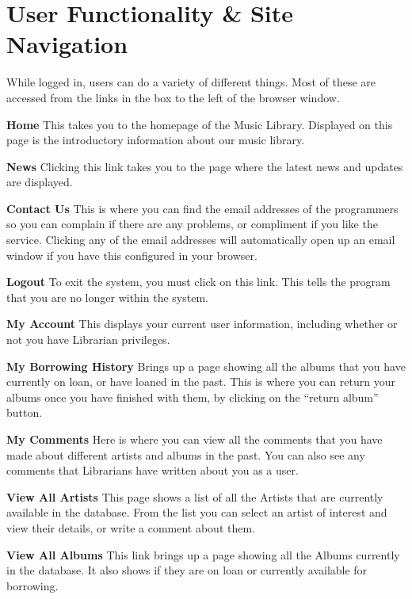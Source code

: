 \documentclass{article}
\begin{document}
\section{User Functionality \& Site Navigation}
While logged in, users can do a variety of different things. Most of these are accessed from the links in the box to the left of the browser window.
\begin{description}
\item{\bf{Home}}
This takes you to the homepage of the Music Library. Displayed on this page is the introductory information about our music library.
\item{\bf{News}}
Clicking this link takes you to the page where the latest news and updates are displayed.
\item{\bf{Contact Us}}
This is where you can find the email addresses of the programmers so you can complain if there are any problems, or compliment if you like the service. Clicking any of the email addresses will automatically open up an email window if you have this configured in your browser.

\item{\bf{Logout}}
To exit the system, you must click on this link. This tells the program that you are no longer within the system.
\item{\bf{My Account}}
This displays your current user information, including whether or not you have Librarian privileges.
\item{\bf{My Borrowing History}}
Brings up a page showing all the albums that you have currently on loan, or have loaned in the past. This is where you can return your albums once you have finished with them, by clicking on the ``return album'' button.
\item{\bf{My Comments}}
Here is where you can view all the comments that you have made about different artists and albums in the past. You can also see any comments that Librarians have written about you as a user.
\item{\bf{View All Artists}}
This page shows a list of all the Artists that are currently available in the database. From the list you can select an artist of interest and view their details, or write a comment about them.

\item{\bf{View All Albums}}
This link brings up a page showing all the Albums currently in the database. It also shows if they are on loan or currently available for borrowing.
\end{description}
\end{document}
